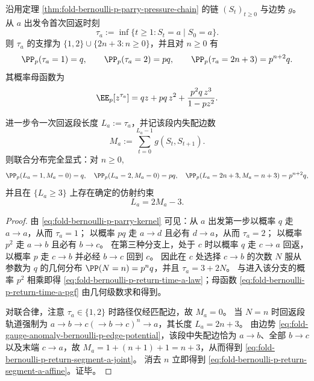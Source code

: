 \begin{proposition}[状态 \(a\) 的再生结构与回返时间的精确律]\label{prop:fold-bernoulli-p-return-time-a}
沿用定理 \ref{thm:fold-bernoulli-p-parry-pressure-chain} 的链 \((S_t)_{t\ge 0}\) 与边势 \(g\)。
从 \(a\) 出发令首次回返时刻
\[
\tau_a:=\inf\{t\ge 1:S_t=a\mid S_0=a\}.
\]
则 \(\tau_a\) 的支撑为 \(\{1,2\}\cup\{2n+3:n\ge 0\}\)，并且对 \(n\ge 0\) 有
\begin{equation}\label{eq:fold-bernoulli-p-return-time-a-law}
\PP_p(\tau_a=1)=q,\qquad
\PP_p(\tau_a=2)=pq,\qquad
\PP_p(\tau_a=2n+3)=p^{n+2}q.
\end{equation}
其概率母函数为
\begin{equation}\label{eq:fold-bernoulli-p-return-time-a-pgf}
\EE_p\!\left[z^{\tau_a}\right]
=qz+pq\,z^2+\frac{p^2q\,z^3}{1-pz^2}.
\end{equation}

进一步令一次回返段长度 \(L_a:=\tau_a\)，并记该段内失配边数
\[
M_a:=\sum_{t=0}^{L_a-1} g(S_t,S_{t+1}).
\]
则联合分布完全显式：对 \(n\ge 0\),
\begin{equation}\label{eq:fold-bernoulli-p-return-segment-a-joint}
\PP_p(L_a=1,M_a=0)=q,\quad
\PP_p(L_a=2,M_a=0)=pq,\quad
\PP_p(L_a=2n+3,M_a=n+3)=p^{n+2}q,
\end{equation}
并且在 \(\{L_a\ge 3\}\) 上存在确定的仿射约束
\begin{equation}\label{eq:fold-bernoulli-p-return-segment-a-affine}
L_a=2M_a-3.
\end{equation}
\end{proposition}
\begin{proof}
由 \eqref{eq:fold-bernoulli-p-parry-kernel} 可见：从 \(a\) 出发第一步以概率 \(q\) 走 \(a\to a\)，从而 \(\tau_a=1\)；
以概率 \(pq\) 走 \(a\to d\) 且必有 \(d\to a\)，从而 \(\tau_a=2\)；
以概率 \(p^2\) 走 \(a\to b\) 且必有 \(b\to c\)。
在第三种分支上，处于 \(c\) 时以概率 \(q\) 走 \(c\to a\) 回返，以概率 \(p\) 走 \(c\to b\) 并必经 \(b\to c\) 回到 \(c\)。
因此在 \(c\) 处选择 \(c\to b\) 的次数 \(N\) 服从参数为 \(q\) 的几何分布 \(\PP(N=n)=p^n q\)，并且 \(\tau_a=3+2N\)。
与进入该分支的概率 \(p^2\) 相乘即得 \eqref{eq:fold-bernoulli-p-return-time-a-law}；母函数 \eqref{eq:fold-bernoulli-p-return-time-a-pgf} 由几何级数求和得到。

对联合律，注意 \(\tau_a\in\{1,2\}\) 时路径仅经匹配边，故 \(M_a=0\)。
当 \(N=n\) 时回返段轨道强制为
\(
a\to b\to c(\to b\to c)^n\to a
\)，其长度 \(L_a=2n+3\)。
由边势 \eqref{eq:fold-gauge-anomaly-bernoulli-p-edge-potential}，该段中失配边恰为 \(a\to b\)、全部 \(b\to c\) 以及末端 \(c\to a\)，故 \(M_a=1+(n+1)+1=n+3\)，从而得到 \eqref{eq:fold-bernoulli-p-return-segment-a-joint}。
消去 \(n\) 立即得到 \eqref{eq:fold-bernoulli-p-return-segment-a-affine}。证毕。
\end{proof}

